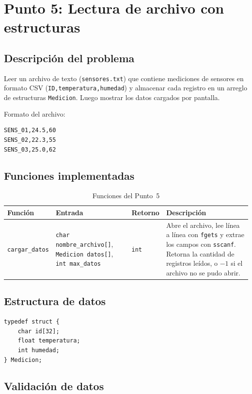 \documentclass[12pt, letterpaper]{article}
\begin{document}
\section{Punto 5: Lectura de archivo con estructuras}

\subsection{Descripción del problema}

Leer un archivo de texto (\texttt{sensores.txt}) que contiene mediciones de
sensores en formato CSV (\texttt{ID,temperatura,humedad}) y almacenar cada
registro en un arreglo de estructuras \texttt{Medicion}. Luego mostrar los
datos cargados por pantalla.

Formato del archivo:
\begin{verbatim}
SENS_01,24.5,60
SENS_02,22.3,55
SENS_03,25.0,62
\end{verbatim}

\subsection{Funciones implementadas}

\begin{table}[H]
\centering
\begin{tabular}{|l|p{4cm}|l|p{5cm}|}
\hline
\textbf{Función} & \textbf{Entrada} & \textbf{Retorno} & \textbf{Descripción} \\
\hline
\texttt{cargar\_datos} &
\texttt{char nombre\_archivo[]},
\texttt{Medicion datos[]},
\texttt{int max\_datos} &
\texttt{int} &
Abre el archivo, lee línea a línea con \texttt{fgets} y extrae los campos
con \texttt{sscanf}. Retorna la cantidad de registros leídos, o $-1$ si
el archivo no se pudo abrir. \\
\hline
\end{tabular}
\caption{Funciones del Punto~5}
\end{table}

\subsection{Estructura de datos}

\begin{verbatim}
typedef struct {
    char id[32];
    float temperatura;
    int humedad;
} Medicion;
\end{verbatim}

\subsection{Validación de datos}
\end{document}
